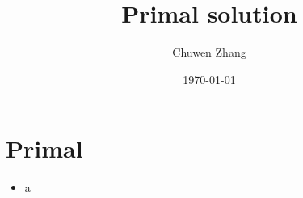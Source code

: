\documentclass[../main]{subfiles}
\title{Primal solution}
\author{Chuwen Zhang}
\date{\today}
\begin{document}
\maketitle
{
    \setcounter{tocdepth}{3}
    \tableofcontents
}
\section{Primal}

\begin{itemize}
    \item  a
\end{itemize}
\end{document}
